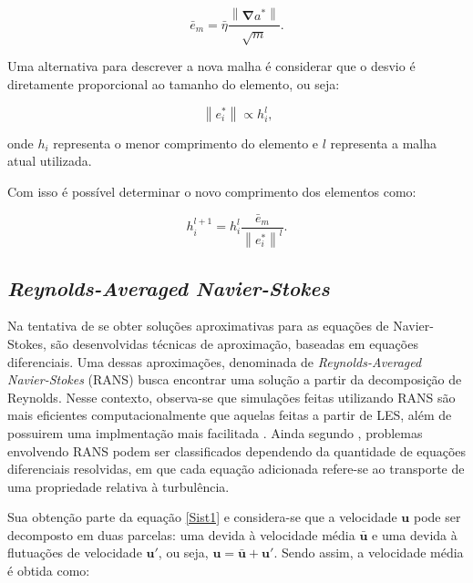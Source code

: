 \documentclass[_ArquivoPrincipal.tex]{subfiles}
\begin{document}
\begin{equation}
    \bar{e}_m=\bar{\eta}\frac{\left\lVert\mathbf{\nabla}a^*\right\lVert}{\sqrt{m}}\text{.}
    \label{desvobj}
\end{equation}

Uma alternativa para descrever a nova malha é considerar que o desvio é diretamente proporcional ao tamanho do elemento, ou seja:

\begin{equation}
    \left\lVert e_i^*\right\lVert\propto h_i^l\text{,}
    \label{e-h}
\end{equation}

\noindent onde $h_i$ representa o menor comprimento do elemento e $l$ representa a malha atual utilizada.

Com isso é possível determinar o novo comprimento dos elementos como:

\begin{equation}
    h_i^{l+1}=h_i^l\frac{\bar{e}_m}{\left\lVert e_i^*\right\lVert^l}\text{.}
    \label{hl1}
\end{equation}

\subsection{\textit{Reynolds-Averaged Navier-Stokes}} \label{RANS}

Na tentativa de se obter soluções aproximativas para as equações de Navier-Stokes, são desenvolvidas técnicas de aproximação, baseadas em equações diferenciais. Uma dessas aproximações, denominada de \textit{Reynolds-Averaged Navier-Stokes} (RANS) busca encontrar uma solução a partir da decomposição de Reynolds. Nesse contexto, observa-se que simulações feitas utilizando RANS são mais eficientes computacionalmente que aquelas feitas a partir de LES, além de possuirem uma implmentação mais facilitada \cite{alfonsi2009reynolds, ling2015evaluation}. Ainda segundo , problemas envolvendo RANS podem ser classificados dependendo da quantidade de equações diferenciais resolvidas, em que cada equação adicionada refere-se ao transporte de uma propriedade relativa à turbulência.

Sua obtenção parte da equação \ref{Sist1} e considera-se que a velocidade $\mathbf{u}$ pode ser decomposto em duas parcelas: uma devida à velocidade média $\bar{\mathbf{u}}$ e uma devida à flutuações de velocidade $\mathbf{u}'$, ou seja, $\mathbf{u}=\bar{\mathbf{u}}+\mathbf{u}'$. Sendo assim, a velocidade média é obtida como:
\end{document}
